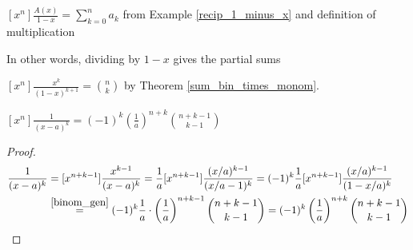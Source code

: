 \documentclass[a4paper]{article}
\begin{document}
\begin{lemma}\label{part_sums_gen}
$\displaystyle[x^n]\frac{A(x)}{1-x}=\sum_{k=0}^na_k$ from Example \ref{recip_1_minus_x} and definition of multiplication
\begin{arrows}
\item In other words, dividing by $1-x$ gives the partial sums
\end{arrows}
\end{lemma}
%
%

\begin{lemma}\label{binom_gen}
$\displaystyle[x^n]\frac{x^k}{(1-x)^{k+1}}=\binom nk$ by Theorem \ref{sum_bin_times_monom}.
\end{lemma}

\begin{lemma}
$\displaystyle [x^n]\frac1{(x-a)^k}=(-1)^k\left(\frac1a\right)^{n+k}\binom{n+k-1}{k-1}$

\begin{hl}
\begin{proof}
\begin{align*}
[x^n]\frac1{(x-a)^k}
&=[x^{n+k-1}]\frac{x^{k-1}}{(x-a)^k}
=\frac1a[x^{n+k-1}]\frac{(x/a)^{k-1}}{(x/a-1)^k}
=(-1)^k\frac1a[x^{n+k-1}]\frac{(x/a)^{k-1}}{(1-x/a)^k}\\
&\overset{\ref{binom_gen}}=(-1)^k\frac1a\cdot\left(\frac1a\right)^{n+k-1}\binom{n+k-1}{k-1}
=(-1)^k\left(\frac1a\right)^{n+k}\binom{n+k-1}{k-1}\qedhere
\end{align*}
\end{proof}
\end{hl}
\end{lemma}

\end{document}
